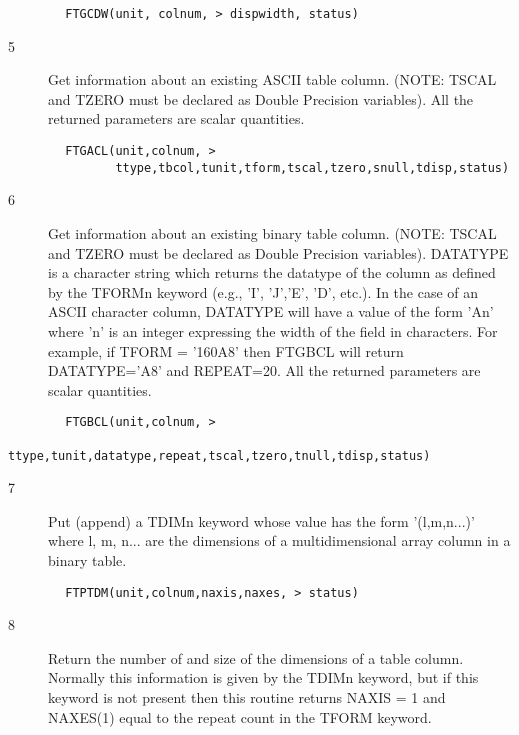 \documentclass[11pt]{book}
\begin{document}
\begin{verbatim}
        FTGCDW(unit, colnum, > dispwidth, status)
\end{verbatim}

\begin{description}
\item[5 ] Get information about an existing ASCII table column.  (NOTE: TSCAL and
    TZERO must be declared as Double Precision variables).  All the
   returned parameters are scalar quantities.
\end{description}

\begin{verbatim}
        FTGACL(unit,colnum, >
               ttype,tbcol,tunit,tform,tscal,tzero,snull,tdisp,status)
\end{verbatim}

\begin{description}
\item[6 ] Get information about an existing binary table column. (NOTE: TSCAL and
    TZERO must be declared as Double Precision variables). DATATYPE is a
    character string which returns the datatype of the column as defined
    by the TFORMn keyword (e.g., 'I', 'J','E', 'D', etc.).  In the case
    of an ASCII character column, DATATYPE will have a value of the
    form 'An' where 'n' is an integer expressing the width of the field
    in characters.  For example, if TFORM = '160A8' then FTGBCL will return
    DATATYPE='A8' and REPEAT=20.   All the returned parameters are scalar
   quantities.
\end{description}

\begin{verbatim}
        FTGBCL(unit,colnum, >
               ttype,tunit,datatype,repeat,tscal,tzero,tnull,tdisp,status)
\end{verbatim}

\begin{description}
\item[7 ] Put (append) a TDIMn keyword whose value has the form '(l,m,n...)'
    where l, m, n... are the dimensions of a multidimensional array
   column in a binary table.
\end{description}

\begin{verbatim}
        FTPTDM(unit,colnum,naxis,naxes, > status)
\end{verbatim}

\begin{description}
\item[8 ] Return the number of and size of the dimensions of a table column.
    Normally this information is given by the TDIMn keyword, but if
    this keyword is not present then this routine returns NAXIS = 1
   and NAXES(1) equal to the repeat count in the TFORM keyword.
\end{description}
\end{document}
